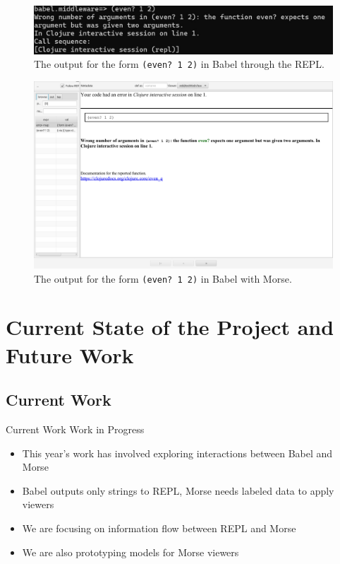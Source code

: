 \documentclass{beamer}
\begin{document}
\begin{frame}
  \begin{figure}
    \centering
    \includegraphics[width=\textwidth, height=0.25\textheight]{../resources/BabelREPL.jpg}
    \caption{The output for the form \texttt{(even?~1~2)} in Babel through the REPL. }
    \label{fig:BabelREPL}
  \end{figure}
\end{frame}

\begin{frame}
  \begin{figure}
    \centering
    \includegraphics[width=\textwidth]{../resources/BabelViewerExample.png}
    \caption{The output for the form \texttt{(even? 1 2)} in Babel with Morse.}
    \label{fig:defaultclj}
  \end{figure}
\end{frame}

\section{Current State of the Project and Future Work}
\subsection{Current Work}
\begin{frame}{Current Work}
  Work in Progress
  \begin{itemize}
    \item This year's work has involved exploring interactions between Babel and Morse
    \item Babel outputs only strings to REPL, Morse needs labeled data to apply viewers
    \item We are focusing on information flow between REPL and Morse
    \item We are also prototyping models for Morse viewers
  \end{itemize}
\end{frame}
\end{document}
